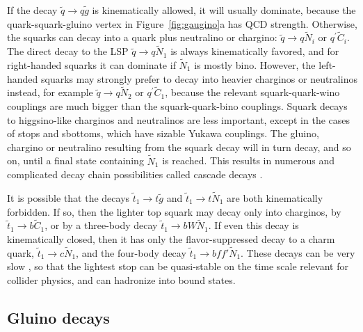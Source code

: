 \documentclass[12pt]{article}
\def\stilde{\widetilde}
\begin{document}
If the decay $ \stilde q \rightarrow q\stilde g $ is kinematically 
allowed, it will usually dominate, because the quark-squark-gluino vertex 
in Figure~{\ref{fig:gaugino}}a has QCD strength. Otherwise, the squarks 
can decay into a quark plus neutralino or chargino: $ \stilde q 
\rightarrow q \stilde N_i$ or $ q^\prime \stilde C_i $. The direct decay 
to the LSP $\stilde q \rightarrow q \stilde N_1$ is always kinematically 
favored, and for right-handed squarks it can dominate if 
$\stilde N_1$ is mostly bino. However, the left-handed squarks may strongly prefer 
to decay into heavier charginos or neutralinos instead, for example 
$\stilde q \rightarrow q \stilde N_2$ or $q^\prime \stilde C_1$, because 
the relevant squark-quark-wino couplings are much bigger than the 
squark-quark-bino couplings. Squark decays to higgsino-like charginos and 
neutralinos are less important, except in the cases of stops and sbottoms, 
which have sizable Yukawa couplings. The gluino, chargino or neutralino 
resulting from the squark decay will in turn decay, and so on, until a 
final state containing $\stilde N_1$ is reached. This results in 
numerous and complicated decay chain possibilities called cascade decays 
\cite{cascades}.

It is possible that the decays $\stilde t_1 \rightarrow t\stilde g$ and 
$\stilde t_1 \rightarrow t \stilde N_1$ are both kinematically forbidden. 
If so, then the lighter top squark may decay only into charginos, by 
$\stilde t_1 \rightarrow b \stilde C_1$, or by a three-body decay
$\stilde t_1 \rightarrow b W \stilde N_1$. If even this decay is 
kinematically closed, then it has only the flavor-suppressed decay to a 
charm quark, $ \stilde t_1\rightarrow c \stilde N_1$, and the four-body 
decay $ \stilde t_1\rightarrow bff' \stilde N_1 $. These decays can be 
very slow \cite{stoptocharmdecay}, so that the lightest stop can be 
quasi-stable on the time scale relevant for collider physics, and can 
hadronize into bound states.

\subsection{Gluino decays}\label{subsec:decays.gluino}
\setcounter{equation}{0}
\setcounter{footnote}{1}
\end{document}

